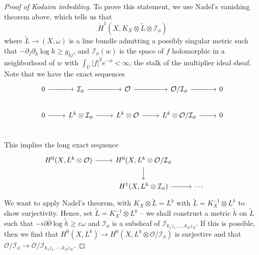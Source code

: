 \documentclass{../mathnotes}
\begin{document}
\begin{proof}[Proof of Kodaira imbedding]
     To prove this statement, we use Nadel's vanishing theorem above, which tells us that
     \[\check H^1(X,K_X\otimes\tilde L\otimes \mathcal{I}_{\phi})\]
     where $\tilde L\to(X,\omega)$ is a line bundle admitting a possibly singular metric
     such that $-\partial_j\partial_{\bar k}\log h\geq g_{\bar kj}$, and $\mathcal{I}_\phi(w)$
     is the space of $f$ holomorphic in a neighborhood of $w$ with $\int_U|f|^2e^{-\phi}<\infty$,
     the stalk of the multiplier ideal sheaf.
     Note that we have the exact sequences
     \begin{equation*}
         \begin{tikzcd}
             0\arrow{r}&\mathcal{I}_\phi\arrow{r}&\mathcal{O}\arrow{r}&\mathcal{O}/\mathcal{I}_{\phi}\arrow{r}&0\\
             0\arrow{r}&L^k\otimes\mathcal{I}_\phi\arrow{r}&L^k\otimes\mathcal{O}\arrow{r}&L^k\otimes\mathcal{O}/\mathcal{I}_{\phi}\arrow{r}&0\\
         \end{tikzcd}
     \end{equation*}
     This implies the long exact sequence
     \begin{equation*}
         \begin{tikzcd}
             H^0(X,L^k\otimes\mathcal{O})\arrow{r}&H^0(X,L^k\otimes\mathcal{O}/\mathcal{I}_\phi\arrow{d}&&\\
             &H^1(X,L^k\otimes \mathcal{I}_\phi)\arrow{r}&\cdots
         \end{tikzcd}
     \end{equation*}
     We want to apply Nadel's theorem, with $K_X\otimes\tilde L=L^k$ with $\tilde L=K^{-1}_X\otimes L^k$
     to show surjectivity. Hence, set $\tilde L=K_X^{-1}\otimes L^k$ -- we shall construct a metric $\tilde h$
     on $\tilde L$ such that $-i\partial\bar\partial\log\tilde h\geq\varepsilon\omega$ and $\mathcal{I}_\phi$
     is a subsheaf of $\mathcal{I}_{k_1z_1,\ldots,k_Nz_N}$. If this is possible, then we find that
     $H^0(X,L^k)\to H^0(X,L^k\otimes\mathcal{O}/\mathcal{I}_\phi)$ is surjective and that
     $\mathcal{O}/\mathcal{I}_\phi\to\mathcal{O}/\mathcal{I}_{k_1z_1,\cdots,k_Nz_N}$.


\end{proof}
\end{document}
